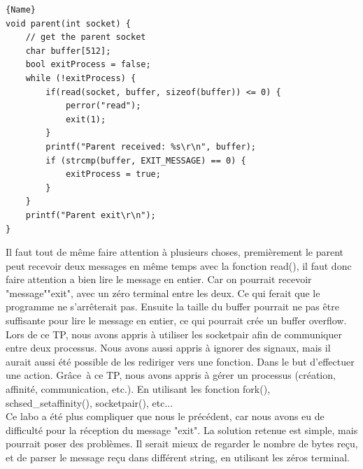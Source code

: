 \documentclass[
	a4paper, %
	10pt, %
]{CSUniSchoolLabReport}
\begin{document}
\begin{minipage}{.45\textwidth}
\begin{lstlisting}[style=CStyle, caption=Processus Parent, firstnumber=1]{Name}
void parent(int socket) {
	// get the parent socket
	char buffer[512];
	bool exitProcess = false;
	while (!exitProcess) {
		if(read(socket, buffer, sizeof(buffer)) <= 0) {
			perror("read");
			exit(1);
		}
		printf("Parent received: %s\r\n", buffer);
		if (strcmp(buffer, EXIT_MESSAGE) == 0) {
			exitProcess = true;
		}
	}
	printf("Parent exit\r\n");
}
\end{lstlisting}
\end{minipage}
Il faut tout de m\^eme faire attention \`a plusieurs choses, premi\`erement le parent peut recevoir deux messages en m\^eme temps avec la fonction read(), il faut donc faire attention a bien lire le message en entier.
Car on pourrait recevoir "message""exit", avec un z\'ero terminal entre les deux. Ce qui ferait que le programme ne s'arr\^eterait pas.
Ensuite la taille du buffer pourrait ne pas \^etre suffisante pour lire le message en entier, ce qui pourrait crée un buffer overflow.\\

Lors de ce TP, nous avons appris \`a utiliser les socketpair afin de communiquer entre deux processus.
Nous avons aussi appris \`a ignorer des signaux, mais il aurait aussi été possible de les rediriger vers une fonction. Dans le but d'effectuer une action.
Gr\^ace\ \`a ce TP, nous avons appris \`a g\'erer un processus (création, affinité, communication, etc.). En utilisant les fonction fork(), schsed\_setaffinity(), socketpair(), etc...\\

Ce labo a été plus compliquer que nous le pr\'ec\'edent, car nous avons eu de difficulté pour la r\'eception du message "exit". La solution retenue est simple, mais pourrait poser des probl\`emes.
Il serait mieux de regarder le nombre de bytes re\c{c}u, et de parser le message re\c{c}u dans diff\'erent string, en utilisant les z\'eros terminal.
\end{document}
